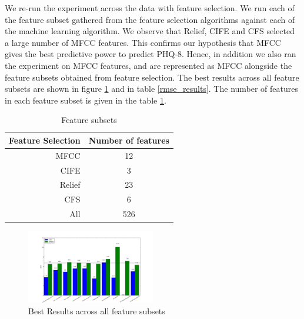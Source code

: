 \documentclass{article}
\begin{document}
	We re-run the experiment across the data with feature selection. We run each of the feature subset gathered from the feature selection algorithms against each of the machine learning algorithm. 
	We observe that Relief, CIFE and CFS selected a large number of MFCC features. This confirms our hypothesis that MFCC gives the best predictive power to predict PHQ-8. Hence, in addition we also ran 
	the experiment on MFCC features, and are represented as MFCC alongside the feature subsets obtained from feature selection. The best results across all feature subsets are shown in figure \ref{results_best} and in table \ref{rmse_results}. The number of features in each feature subset is given in the table \ref{feat_subset}.

 	\begin{table}[h]
 		\begin{center}
  			\begin{tabular}{ | r | c | }
    			\hline
			 Feature Selection & Number of features \\ \hline\hline
			 MFCC           & 12 \\ \hline
			 CIFE        & 3 \\ \hline
			 Relief & 23 \\ \hline
			 CFS & 6 \\ \hline
			 All & 526 \\ \hline
			 \end{tabular}
		\end{center}
 	\caption{Feature subsets}
 	\label{feat_subset}
 	\end{table}

	\begin{figure}[h]
 		\begin{center}
		\includegraphics[width=0.5\textwidth]{results_best} 
  		\end{center}
  		\caption{Best Results across all feature subsets}
  		\label{results_best}
 	\end{figure}
\end{document}
